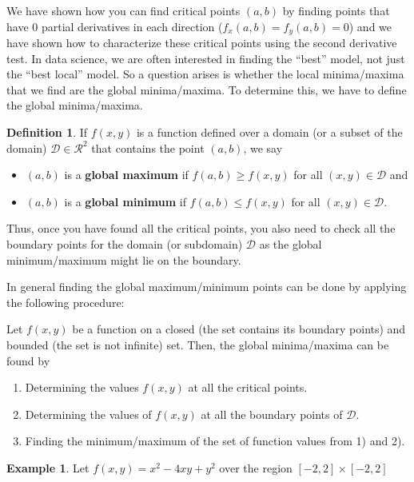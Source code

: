 \documentclass[
]{book}
\theoremstyle{definition}
\newtheorem{definition}{Definition}[chapter]
\theoremstyle{definition}
\newtheorem{example}{Example}[chapter]
\theoremstyle{definition}
\theoremstyle{definition}
\theoremstyle{remark}
\begin{document}
We have shown how you can find critical points \((a, b)\) by finding points that have 0 partial derivatives in each direction (\(f_x(a, b) = f_y(a, b) = 0\)) and we have shown how to characterize these critical points using the second derivative test. In data science, we are often interested in finding the ``best'' model, not just the ``best local'' model. So a question arises is whether the local minima/maxima that we find are the global minima/maxima. To determine this, we have to define the global minima/maxima.

\begin{definition}

If \(f(x, y)\) is a function defined over a domain (or a subset of the domain) \(\mathcal{D} \in \mathcal{R}^2\) that contains the point \((a, b)\), we say

\begin{itemize}
\item
  \((a, b)\) is a \textbf{global maximum} if \(f(a, b) \geq f(x, y)\) for all \((x, y) \in \mathcal{D}\) and
\item
  \((a, b)\) is a \textbf{global minimum} if \(f(a, b) \leq f(x, y)\) for all \((x, y) \in \mathcal{D}\).
\end{itemize}

\end{definition}

Thus, once you have found all the critical points, you also need to check all the boundary points for the domain (or subdomain) \(\mathcal{D}\) as the global minimum/maximum might lie on the boundary.

In general finding the global maximum/minimum points can be done by applying the following procedure:

Let \(f(x, y)\) be a function on a closed (the set contains its boundary points) and bounded (the set is not infinite) set. Then, the global minima/maxima can be found by

\begin{enumerate}
\def\labelenumi{\arabic{enumi})}
\item
  Determining the values \(f(x, y)\) at all the critical points.
\item
  Determining the values of \(f(x, y)\) at all the boundary points of \(\mathcal{D}\).
\item
  Finding the minimum/maximum of the set of function values from 1) and 2).
\end{enumerate}

\begin{example}
Let \(f(x, y) = x^2 - 4xy + y^2\) over the region \([-2,2]\times[-2, 2]\)
\end{example}
\end{document}
